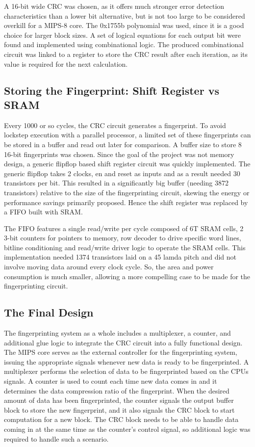 \documentclass[12pt,journal,compsoc]{IEEEtran}
\begin{document}
A 16-bit wide CRC was chosen, as it offers much stronger error detection characteristics than a lower bit alternative, but is not too large to be considered overkill for a MIPS-8 core. The 0x1755b polynomial was used, since it is a good choice for larger block sizes\cite{Koopman}. A set of logical equations for each output bit were found\cite{Parcrc} and implemented using combinational logic. The produced combinational circuit was linked to a register to store the CRC result after each iteration, as its value is required for the next calculation. 


\subsection{Storing the Fingerprint: Shift Register vs SRAM}
Every 1000 or so cycles, the CRC circuit generates a fingerprint. To avoid lockstep execution with a parallel processor, a limited set of these fingerprints can be stored in a buffer and read out later for comparison. A buffer size to store 8 16-bit fingerprints was chosen. Since the goal of the project was not memory design, a generic flipflop based shift register circuit was quickly implemented. The generic flipflop takes 2 clocks, en and reset as inputs and as a result needed 30 transistors per bit. This resulted in a significantly big buffer (needing 3872 transistors) relative to the size of the fingerprinting circuit, skewing the energy or performance savings primarily proposed. Hence the shift register was replaced by a FIFO built with SRAM. 

The FIFO features a single read/write per cycle composed of 6T SRAM cells, 2 3-bit counters for pointers to memory, row decoder to drive specific word lines, bitline conditioning and read/write driver logic to operate the SRAM cells. This implementation needed 1374 transistors laid on a 45 lamda pitch and did not involve moving data around every clock cycle. So, the area and power consumption is much smaller, allowing a more compelling case to be made for the fingerprinting circuit. 


\subsection{The Final Design}
The fingerprinting system as a whole includes a multiplexer, a counter, and additional glue logic to integrate the CRC circuit into a fully functional design. The MIPS core serves as the external controller for the fingerprinting system, issuing the appropriate signals whenever new data is ready to be fingerprinted. A multiplexer performs the selection of data to be fingerprinted based on the CPUs signals. A counter is used to count each time new data comes in and it determines the data compression ratio of the fingerprint. When the desired amount of data has been fingerprinted, the counter signals the output buffer block to store the new fingerprint, and it also signals the CRC block to start computation for a new block. The CRC block needs to be able to handle data coming in at the same time as the counter's control signal, so additional logic was required to handle such a scenario. 
\end{document}
